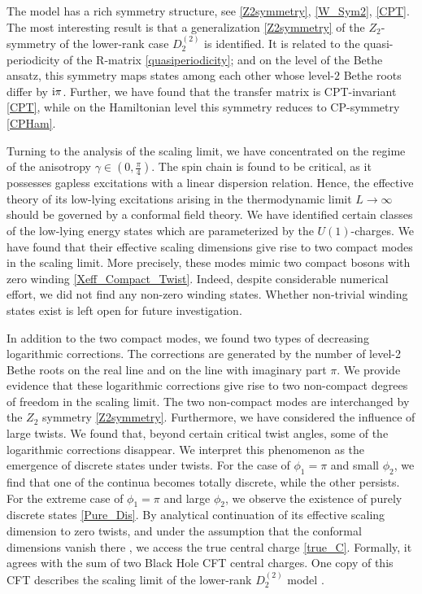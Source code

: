 \documentclass[12pt]{article}
\numberwithin{equation}{section}
\newcommand{\ri}{{\rm i}}
\begin{document}
	The model has a rich symmetry structure, see \eqref{Z2symmetry}, \eqref{W_Sym2}, \eqref{CPT}. The most interesting result is that a generalization \eqref{Z2symmetry} of the $Z_2$-symmetry of the lower-rank case $D^{(2)}_2$ is identified. It is related to the quasi-periodicity of the R-matrix \eqref{quasiperiodicity}; and on the level of the Bethe ansatz, this symmetry maps states among each other whose level-$2$ Bethe roots differ by $\ri \pi$. Further, we have found that the transfer matrix is CPT-invariant \eqref{CPT}, while on the Hamiltonian level this symmetry reduces to  CP-symmetry \eqref{CPHam}.
	
	Turning to the analysis of the scaling limit, we have concentrated on the regime of the anisotropy $\gamma\in (0,\frac{\pi}{4})$. The spin chain is found to be critical, as it possesses gapless excitations with a linear dispersion relation. Hence, the effective theory of its low-lying excitations arising in the thermodynamic limit $L\to \infty$ should be governed by a conformal field theory. We have identified certain classes of the low-lying energy states which are parameterized by the $U(1)$-charges. We have found that their effective scaling dimensions give rise to two compact modes in the scaling limit. More precisely, these modes mimic two compact bosons with zero winding \eqref{Xeff_Compact_Twist}. Indeed, despite considerable numerical effort, we did not find any non-zero winding states. Whether non-trivial winding states exist is left open for future investigation. 
	
	In addition to the two compact modes, we found two types of decreasing logarithmic corrections. The corrections are generated by the number of level-2 Bethe roots on the real line and on the line with imaginary part $\pi$.  We provide evidence that these logarithmic corrections give rise to two non-compact degrees of freedom in the scaling limit. The two non-compact modes are interchanged by the $Z_2$ symmetry \eqref{Z2symmetry}. Furthermore, we have considered the influence of large twists. We found that, beyond certain critical twist angles, some of the logarithmic corrections disappear. We interpret this phenomenon as the emergence of discrete states under twists. For the case of $\phi_1=\pi$ and small $\phi_2$, we find that one of the continua becomes totally discrete, while the other persists.  For the extreme case of $\phi_1=\pi$ and large $\phi_2$, we observe the existence of purely discrete states \eqref{Pure_Dis}. By analytical continuation of its effective scaling dimension to zero twists, and under the assumption that the conformal dimensions vanish there \cite{VeJS14,FrHo17}, we access the true central charge \eqref{true_C}. Formally, it agrees with the sum of two Black Hole CFT central charges. One copy of this CFT describes the scaling limit of the lower-rank $D^{(2)}_2$ model \cite{NeRe21a,IkJS12,BKKL21a}. 
	
\end{document}
